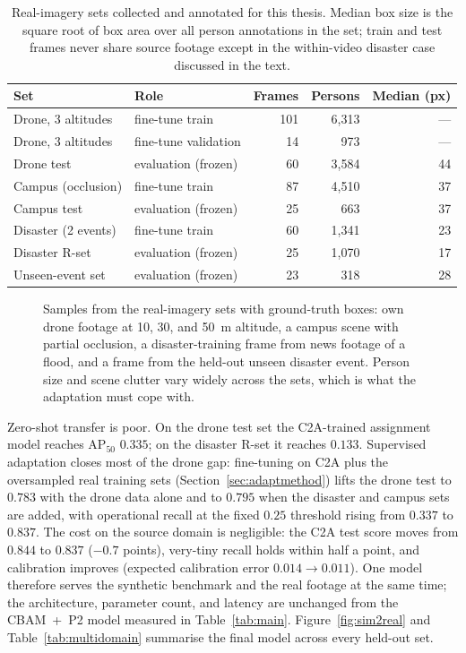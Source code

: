 \begin{table}[tbp]
  \centering
  \caption{Real-imagery sets collected and annotated for this thesis. Median box
  size is the square root of box area over all person annotations in the set;
  train and test frames never share source footage except in the within-video
  disaster case discussed in the text.}
  \label{tab:owndata}
  \setlength{\tabcolsep}{5pt}
  \begin{tabular}{@{}l l r r r@{}}
    \toprule
    Set & Role & Frames & Persons & Median (px) \\
    \midrule
    Drone, 3 altitudes  & fine-tune train      & 101 & 6{,}313 & --- \\
    Drone, 3 altitudes  & fine-tune validation & 14  & 973     & --- \\
    Drone test          & evaluation (frozen)  & 60  & 3{,}584 & 44 \\
    Campus (occlusion)  & fine-tune train      & 87  & 4{,}510 & 37 \\
    Campus test         & evaluation (frozen)  & 25  & 663     & 37 \\
    Disaster (2 events) & fine-tune train      & 60  & 1{,}341 & 23 \\
    Disaster R-set      & evaluation (frozen)  & 25  & 1{,}070 & 17 \\
    Unseen-event set    & evaluation (frozen)  & 23  & 318     & 28 \\
    \bottomrule
  \end{tabular}
\end{table}

\begin{figure}[tbp]
  \centering
  \caption{Samples from the real-imagery sets with ground-truth boxes: own drone
  footage at 10, 30, and 50~m altitude, a campus scene with partial occlusion, a
  disaster-training frame from news footage of a flood, and a frame from the
  held-out unseen disaster event. Person size and scene clutter vary widely
  across the sets, which is what the adaptation must cope with.}
  \label{fig:realsamples}
\end{figure}

Zero-shot transfer is poor. On the drone test set the C2A-trained assignment
model reaches $\mathrm{AP}_{50}$ $0.335$; on the disaster R-set it reaches
$0.133$. Supervised adaptation closes most of the drone gap: fine-tuning on C2A
plus the oversampled real training sets (Section~\ref{sec:adaptmethod}) lifts the drone test to
$0.783$ with the drone data alone and to $0.795$ when the disaster and campus
sets are added, with operational recall at the fixed $0.25$ threshold rising
from $0.337$ to $0.837$. The cost on the source domain is negligible: the C2A
test score moves from $0.844$ to $0.837$ ($-0.7$ points), very-tiny recall holds
within half a point, and calibration improves (expected calibration error
$0.014 \to 0.011$). One model therefore serves the synthetic benchmark and the
real footage at the same time; the architecture, parameter count, and latency
are unchanged from the CBAM~+~P2 model measured in Table~\ref{tab:main}.
Figure~\ref{fig:sim2real} and Table~\ref{tab:multidomain} summarise the final
model across every held-out set.

